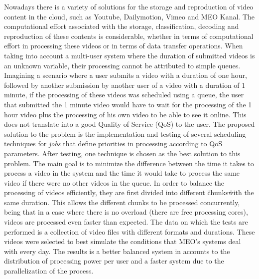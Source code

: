 Nowadays there is a variety of solutions for the storage and reproduction of video content in the cloud, such as Youtube, Dailymotion, Vimeo and MEO Kanal.
The computational effort associated with the storage, classification, decoding and reproduction of these contents is considerable, whether in terms of computational effort in processing these videos or in terms of data transfer operations.
When taking into account a multi-user system where the duration of submitted videos is an unknown variable, their processing cannot be attributed to simple queues.
Imagining a scenario where a user submits a video with a duration of one hour, followed by another submission by another user of a video with a duration of 1 minute,
if the processing of these videos was scheduled using a queue, the user that submitted the 1 minute video would have to wait for the processing of the 1 hour video plus the processing of his own video to be able to see it online. This does not translate into a good Quality of Service (QoS) to the user.
The proposed solution to the problem is the implementation and testing of several scheduling techniques for \textit{jobs} that define priorities in processing according to QoS parameters.
After testing, one technique is chosen as the best solution to this problem.
The main goal is to minimize the difference between the time it takes to process a video in the system and the time it would take to process the same video if there were no other videos in the queue.
In order to balance the processing of videos efficiently, they are first divided into different \"chunks\" with the same duration. This allows the different chunks to be processed concurrently, being that in a case where there is no overload (there are free processing cores), videos are processed even faster than expected.  
The data on which the tests are performed is a collection of video files with different formats and durations. These videos were selected to best simulate the conditions that MEO's systems deal with every day.
The results is a better balanced system in accounts to the distribution of processing power per user and a faster system due to the parallelization of the process.
